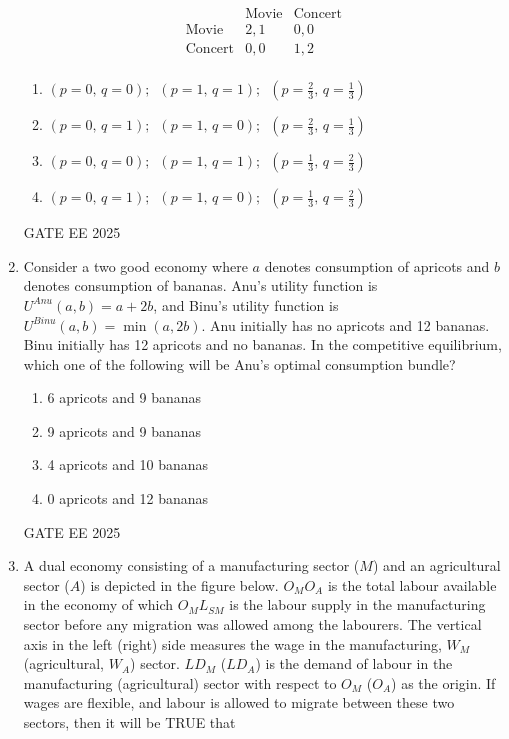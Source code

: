 \documentclass[journal,12pt,onecolumn]{IEEEtran}
\theoremstyle{remark}
\begin{document}
\begin{enumerate}
\[
\begin{array}{c|c|c}
      & \text{Movie} & \text{Concert} \\
\hline
\text{Movie}   & 2,1 & 0,0 \\
\text{Concert} & 0,0 & 1,2 \\
\end{array}
\]
\begin{enumerate}[label=(\Alph*)]
    \item $(p=0,\, q=0);$\, $(p=1,\, q=1);$\, $\displaystyle\left( p=\frac{2}{3},\, q=\frac{1}{3} \right)$
    \item $(p=0,\, q=1);$\, $(p=1,\, q=0);$\, $\displaystyle\left( p=\frac{2}{3},\, q=\frac{1}{3} \right)$
    \item $(p=0,\, q=0);$\, $(p=1,\, q=1);$\, $\displaystyle\left( p=\frac{1}{3},\, q=\frac{2}{3} \right)$
    \item $(p=0,\, q=1);$\, $(p=1,\, q=0);$\, $\displaystyle\left( p=\frac{1}{3},\, q=\frac{2}{3} \right)$
\end{enumerate}
GATE EE 2025\\
\item Consider a two good economy where $a$ denotes consumption of apricots and $b$ denotes consumption of bananas. Anu's utility function is $U^{Anu}(a, b) = a + 2b$, and Binu's utility function is $U^{Binu}(a, b) = \min(a, 2b)$. Anu initially has no apricots and 12 bananas. Binu initially has 12 apricots and no bananas. In the competitive equilibrium, which one of the following will be Anu's optimal consumption bundle?
\begin{enumerate}[label=(\Alph*)]
    \item 6 apricots and 9 bananas
    \item 9 apricots and 9 bananas
    \item 4 apricots and 10 bananas
    \item 0 apricots and 12 bananas
\end{enumerate}
GATE EE 2025\\
\item A dual economy consisting of a manufacturing sector ($M$) and an agricultural sector ($A$) is depicted in the figure below. $O_M O_A$ is the total labour available in the economy of which $O_M L_{SM}$ is the labour supply in the manufacturing sector before any migration was allowed among the labourers. The vertical axis in the left (right) side measures the wage in the manufacturing, $W_M$ (agricultural, $W_A$) sector. $LD_M$ ($LD_A$) is the demand of labour in the manufacturing (agricultural) sector with respect to $O_M$ ($O_A$) as the origin. If wages are flexible, and labour is allowed to migrate between these two sectors, then it will be TRUE that


\end{enumerate}
\end{document}
